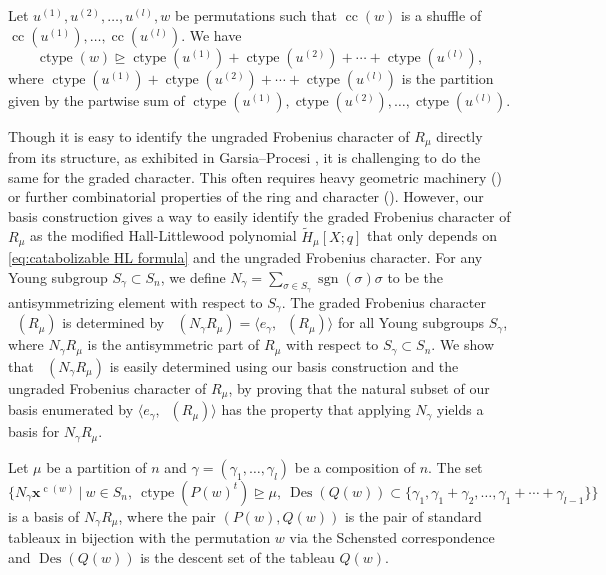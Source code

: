 \documentclass[10pt]{amsart}
\theoremstyle{plain}
\theoremstyle{definition}
\theoremstyle{plain}
\theoremstyle{plain}
\theoremstyle{remark}
\theoremstyle{plain}
\theoremstyle{plain}
\DeclareMathOperator{\ctype}{ctype}
\DeclareMathOperator{\Frob}{Frob}
\DeclareMathOperator{\Hilb}{Hilb}
\DeclareMathOperator{\cc}{cc}
\DeclareMathOperator{\cw}{c}
\DeclareMathOperator{\des}{Des}
\DeclareMathOperator{\sgn}{sgn}
\DeclareMathOperator{\Frobq}{\Frob_q}
\DeclareMathOperator{\Hilbq}{\Hilb_q}
\newcommand{\mHL}{\tilde{H}}
\begin{document}
\begin{thm2}
    Let $u^{(1)}, u^{(2)}, \dots, u^{(l)}, w$ be
    permutations such that $\cc(w)$ is a shuffle of $\cc(u^{(1)}),\dots, \cc(u^{(l)})$.
    We have
    \[\ctype(w) \unrhd \ctype(u^{(1)}) + \ctype( u^{(2)}) + \cdots+ \ctype(u^{(l)}),\]
    where $\ctype(u^{(1)}) + \ctype( u^{(2)}) + \cdots +  \ctype(u^{(l)})$ is the partition given by the partwise sum of $\ctype(u^{(1)}),\ctype( u^{(2)}),\dots,\ctype(u^{(l)})$.
\end{thm2}


Though it is easy to identify the ungraded Frobenius character of $R_\mu$ directly from its structure, as exhibited in Garsia--Procesi \cite{GP}, it is challenging to do the same for the graded character. This often requires heavy geometric machinery (\cite{deCon-Proc}) or further combinatorial properties of the ring and character (\cite{GP}).
However, our basis construction gives a way to easily identify the graded Frobenius character of $R_\mu$ as the modified Hall-Littlewood polynomial $\mHL_\mu[X;q]$ that only depends on \eqref{eq:catabolizable HL formula} and the ungraded Frobenius character.
For any Young subgroup $S_\gamma \subset S_n$, we define $N_{\gamma} = \sum_{\sigma\in S_\gamma} \sgn(\sigma) \sigma$ to be the antisymmetrizing element with respect to $S_\gamma$.
The graded Frobenius character $\Frobq(R_{\mu})$ is determined by $\Hilbq(N_\gamma R_{\mu}) = \langle e_\gamma, \Frobq(R_{\mu})\rangle$ for all Young subgroups $S_\gamma$, where $N_\gamma R_{\mu}$ is the antisymmetric part of $R_{\mu}$ with respect to $S_\gamma\subset S_n$.
We show that $\Hilbq(N_\gamma R_{\mu})$ is easily determined using our basis construction and the ungraded Frobenius character of $R_{\mu}$, by proving that the natural subset of our basis enumerated by $\langle e_\gamma, \Frobq(R_{\mu})\rangle$ has the property that applying $N_\gamma$ yields a basis for $N_\gamma R_{\mu}$.


\begin{prop2}\makeatletter{}\makeatother\label{prop2}
  Let $ \mu$ be a partition of $n$ and $\gamma = (\gamma_1,\dots, \gamma_l)$ be a composition of $n$. 
   The set
      \[ \{ N_\gamma \mathbf{x}^{\cw(w)} \ | \  w \in S_n, \ \ctype(P(w)^t) \unrhd\mu, \ \des(Q(w)) \subset \{\gamma_1,\gamma_1 + \gamma_2, \dots, \gamma_1 + \cdots + \gamma_{l-1}\}\}\]
    is a basis of $N_\gamma R_{\mu}$, where the pair $(P(w),Q(w))$ is the pair of standard tableaux in bijection with the permutation $w$ via the Schensted correspondence and $\des(Q(w))$ is the descent set of the tableau $Q(w)$.
\end{prop2}
\end{document}
